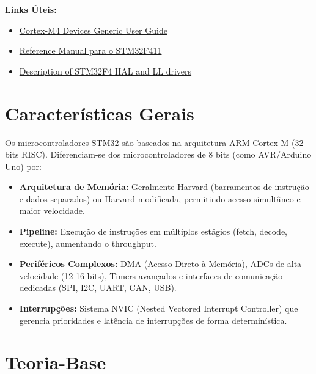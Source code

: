 \documentclass[12pt,a4paper]{article}
\begin{document}
\vspace{0.5cm}
\noindent\textbf{Links Úteis:}
\begin{itemize}
    \item \href{https://developer.arm.com/documentation/dui0553/latest/}{Cortex-M4 Devices Generic User Guide}
    \item \href{https://www.st.com/resource/ja/reference_manual/dm00119316-stm32f411xc-e-advanced-arm-based-32-bit-mcus-stmicroelectronics.pdf}{Reference Manual para o STM32F411}
    \item \href{https://www.st.com/resource/ja/user_manual/dm00105879-description-of-stm32f4-hal-and-ll-drivers-stmicroelectronics.pdf}{Description of STM32F4 HAL and LL drivers}
\end{itemize}



\section*{Características Gerais}

Os microcontroladores STM32 são baseados na arquitetura ARM Cortex-M (32-bits RISC). Diferenciam-se dos microcontroladores de 8 bits (como AVR/Arduino Uno) por:
\begin{itemize}
    \item \textbf{Arquitetura de Memória:} Geralmente Harvard (barramentos de instrução e dados separados) ou Harvard modificada, permitindo acesso simultâneo e maior velocidade.
    \item \textbf{Pipeline:} Execução de instruções em múltiplos estágios (fetch, decode, execute), aumentando o throughput.
    \item \textbf{Periféricos Complexos:} DMA (Acesso Direto à Memória), ADCs de alta velocidade (12-16 bits), Timers avançados e interfaces de comunicação dedicadas (SPI, I2C, UART, CAN, USB).
    \item \textbf{Interrupções:} Sistema NVIC (Nested Vectored Interrupt Controller) que gerencia prioridades e latência de interrupções de forma determinística.
\end{itemize}

\section{Teoria-Base}
\end{document}
